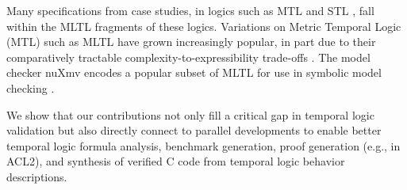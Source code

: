 \documentclass[runningheads]{llncs}
\begin{document}
Many specifications from case studies, in logics such as MTL \cite{AH90} and STL \cite{MN04}, fall within the MLTL fragments of these logics. 
Variations on Metric Temporal Logic (MTL) such as MLTL have grown increasingly popular, in part due to their comparatively tractable complexity-to-expressibility trade-offs \cite{OW08}.
The model checker {\sf nuXmv} encodes a popular subset of MLTL for use in symbolic model checking \cite{nuXmv-v1.1.0}.%

We show that our contributions not only fill a critical gap in temporal logic validation but also directly connect to parallel developments to enable better temporal logic formula analysis, benchmark generation, proof generation (e.g., in ACL2), and synthesis of verified C code from temporal logic behavior descriptions. 


\end{document}
